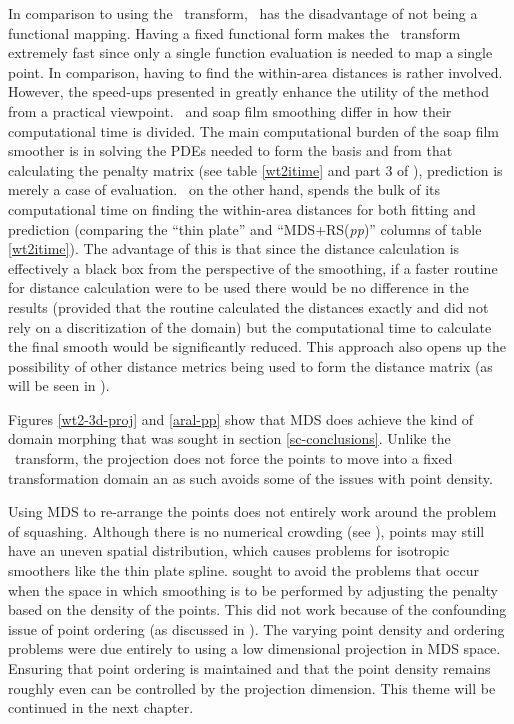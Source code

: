 In comparison to using the \sch\ transform, \mdsap\ has the disadvantage of not being a functional mapping. Having a fixed functional form makes the \sch\ transform extremely fast since only a single function evaluation is needed to map a single point. In comparison, having to find the within-area distances is rather involved. However, the speed-ups presented in  greatly enhance the utility of the method from a practical viewpoint. \mdsap\ and soap film smoothing differ in how their computational time is divided. The main computational burden of the soap film smoother is in solving the PDEs needed to form the basis and from that calculating the penalty matrix (see table \ref{wt2itime} and part 3 of ), prediction is merely a case of evaluation. \mdsap\ on the other hand, spends the bulk of its computational time on finding the within-area distances for both fitting and prediction (comparing the ``thin plate'' and ``MDS+RS(\textit{pp})'' columns of table \ref{wt2itime}). The advantage of this is that since the distance calculation is effectively a black box from the perspective of the smoothing, if a faster routine for distance calculation were to be used there would be no difference in the results (provided that the routine calculated the distances exactly and did not rely on a discritization of the domain) but the computational time to calculate the final smooth would be significantly reduced. This approach also opens up the possibility of other distance metrics being used to form the distance matrix (as will be seen in ).

Figures \ref{wt2-3d-proj} and \ref{aral-pp} show that MDS does achieve the kind of domain morphing that was sought in section \ref{sc-conclusions}. Unlike the \sch\ transform, the projection does not force the points to move into a fixed transformation domain an as such avoids some of the issues with point density. 

Using MDS to re-arrange the points does not entirely work around the problem of squashing. Although there is no numerical crowding (see ), points may still have an uneven spatial distribution, which causes problems for isotropic smoothers like the thin plate spline.  sought to avoid the problems that occur when the space in which smoothing is to be performed by adjusting the penalty based on the density of the points. This did not work because of the confounding issue of point ordering (as discussed in ). The varying point density and ordering problems were due entirely to using a low dimensional projection in MDS space. Ensuring that point ordering is maintained and that the point density remains roughly even can be controlled by the projection dimension. This theme will be continued in the next chapter.

